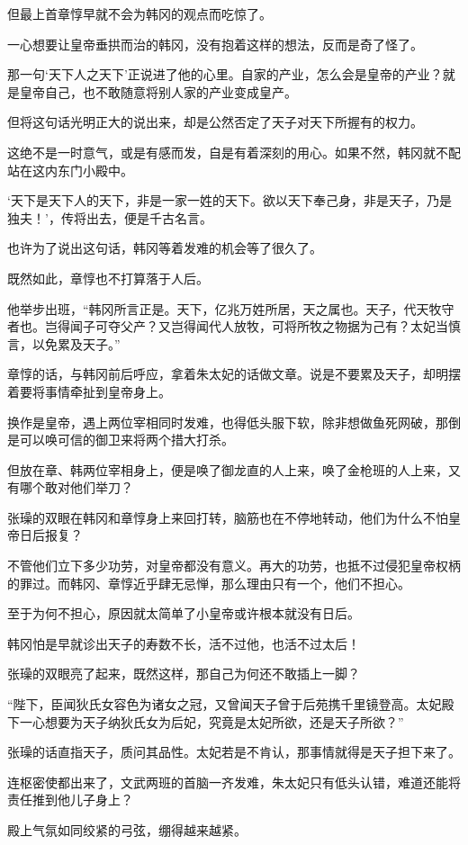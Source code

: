 但最上首章惇早就不会为韩冈的观点而吃惊了。

一心想要让皇帝垂拱而治的韩冈，没有抱着这样的想法，反而是奇了怪了。

那一句‘天下人之天下’正说进了他的心里。自家的产业，怎么会是皇帝的产业？就是皇帝自己，也不敢随意将别人家的产业变成皇产。

但将这句话光明正大的说出来，却是公然否定了天子对天下所握有的权力。

这绝不是一时意气，或是有感而发，自是有着深刻的用心。如果不然，韩冈就不配站在这内东门小殿中。

‘天下是天下人的天下，非是一家一姓的天下。欲以天下奉己身，非是天子，乃是独夫！’，传将出去，便是千古名言。

也许为了说出这句话，韩冈等着发难的机会等了很久了。

既然如此，章惇也不打算落于人后。

他举步出班，“韩冈所言正是。天下，亿兆万姓所居，天之属也。天子，代天牧守者也。岂得闻子可夺父产？又岂得闻代人放牧，可将所牧之物据为己有？太妃当慎言，以免累及天子。”

章惇的话，与韩冈前后呼应，拿着朱太妃的话做文章。说是不要累及天子，却明摆着要将事情牵扯到皇帝身上。

换作是皇帝，遇上两位宰相同时发难，也得低头服下软，除非想做鱼死网破，那倒是可以唤可信的御卫来将两个措大打杀。

但放在章、韩两位宰相身上，便是唤了御龙直的人上来，唤了金枪班的人上来，又有哪个敢对他们举刀？

张璪的双眼在韩冈和章惇身上来回打转，脑筋也在不停地转动，他们为什么不怕皇帝日后报复？

不管他们立下多少功劳，对皇帝都没有意义。再大的功劳，也抵不过侵犯皇帝权柄的罪过。而韩冈、章惇近乎肆无忌惮，那么理由只有一个，他们不担心。

至于为何不担心，原因就太简单了小皇帝或许根本就没有日后。

韩冈怕是早就诊出天子的寿数不长，活不过他，也活不过太后！

张璪的双眼亮了起来，既然这样，那自己为何还不敢插上一脚？

“陛下，臣闻狄氏女容色为诸女之冠，又曾闻天子曾于后苑携千里镜登高。太妃殿下一心想要为天子纳狄氏女为后妃，究竟是太妃所欲，还是天子所欲？”

张璪的话直指天子，质问其品性。太妃若是不肯认，那事情就得是天子担下来了。

连枢密使都出来了，文武两班的首脑一齐发难，朱太妃只有低头认错，难道还能将责任推到他儿子身上？

殿上气氛如同绞紧的弓弦，绷得越来越紧。

